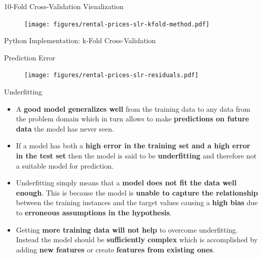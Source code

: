 \documentclass[document.tex]{subfiles}
\begin{document}
    \begin{frame}{10-Fold Cross-Validation Visualization}
        \begin{figure}
            \label{fig:rental-prices-slr-kfold}
            \texttt{[image: figures/rental-prices-slr-kfold-method.pdf]}
        \end{figure}
    \end{frame}

    \begin{frame}{Python Implementation: k-Fold Cross-Validation}
        
    \end{frame}

    \begin{frame}{Prediction Error}
        \begin{figure}
            \label{fig:rental-prices-slr-residuals}
            \texttt{[image: figures/rental-prices-slr-residuals.pdf]}
        \end{figure}
    \end{frame}

    \begin{frame}{Underfitting}
		\begin{itemize}
            \item A \textbf{good model generalizes well} from the training data to any data from the problem domain which in turn allows to make \textbf{predictions on future data} the model has never seen.
            \item If a model has both a \textbf{high error in the training set and a high error in the test set} then the model is said to be \textbf{underfitting} and therefore not a suitable model for prediction.
            \item Underfitting simply means that a \textbf{model does not fit the data well enough}. This is because the model is \textbf{unable to capture the relationship} between the training instances and the target values causing a \textbf{high bias} due to \textbf{erroneous assumptions in the hypothesis}.
            \item Getting \textbf{more training data will not help} to overcome underfitting. Instead the model should be \textbf{sufficiently complex} which is accomplished by adding \textbf{new features} or create \textbf{features from existing ones}.
        \end{itemize}
    \end{frame}
    
\end{document}
